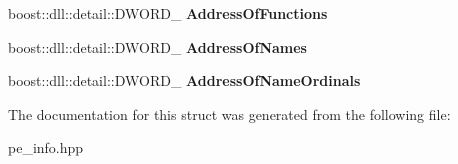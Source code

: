 \begin{DoxyCompactItemize}
\item 
\mbox{\label{a01596_a4d24e72a4f88a4c2f6f5205d8cd692a6}} 
boost\+::dll\+::detail\+::\+D\+W\+O\+R\+D\+\_\+ {\bfseries Address\+Of\+Functions}
\item 
\mbox{\label{a01596_a6bcb8739e2a4a7971e0b8586feecbfde}} 
boost\+::dll\+::detail\+::\+D\+W\+O\+R\+D\+\_\+ {\bfseries Address\+Of\+Names}
\item 
\mbox{\label{a01596_a86a84a8297c28379940f9f748310af8b}} 
boost\+::dll\+::detail\+::\+D\+W\+O\+R\+D\+\_\+ {\bfseries Address\+Of\+Name\+Ordinals}
\end{DoxyCompactItemize}


The documentation for this struct was generated from the following file\+:\begin{DoxyCompactItemize}
\item 
pe\+\_\+info.\+hpp\end{DoxyCompactItemize}
